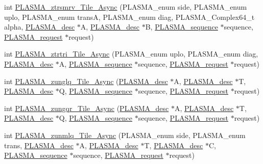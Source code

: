 \begin{DoxyCompactItemize}
\item 
int \hyperlink{group__PLASMA__Complex64__t__Tile__Async_ga0ed911d979585a7940b8436a4b90d494_ga0ed911d979585a7940b8436a4b90d494}{P\+L\+A\+S\+M\+A\+\_\+ztrsmrv\+\_\+\+Tile\+\_\+\+Async} (P\+L\+A\+S\+M\+A\+\_\+enum side, P\+L\+A\+S\+M\+A\+\_\+enum uplo, P\+L\+A\+S\+M\+A\+\_\+enum trans\+A, P\+L\+A\+S\+M\+A\+\_\+enum diag, P\+L\+A\+S\+M\+A\+\_\+\+Complex64\+\_\+t alpha, \hyperlink{structplasma__desc__t}{P\+L\+A\+S\+M\+A\+\_\+desc} $\ast$A, \hyperlink{structplasma__desc__t}{P\+L\+A\+S\+M\+A\+\_\+desc} $\ast$B, \hyperlink{structplasma__sequence__t}{P\+L\+A\+S\+M\+A\+\_\+sequence} $\ast$sequence, \hyperlink{structplasma__request__t}{P\+L\+A\+S\+M\+A\+\_\+request} $\ast$request)
\item 
int \hyperlink{group__PLASMA__Complex64__t__Tile__Async_gadfb88a401f30764bde58c38748e894bd_gadfb88a401f30764bde58c38748e894bd}{P\+L\+A\+S\+M\+A\+\_\+ztrtri\+\_\+\+Tile\+\_\+\+Async} (P\+L\+A\+S\+M\+A\+\_\+enum uplo, P\+L\+A\+S\+M\+A\+\_\+enum diag, \hyperlink{structplasma__desc__t}{P\+L\+A\+S\+M\+A\+\_\+desc} $\ast$A, \hyperlink{structplasma__sequence__t}{P\+L\+A\+S\+M\+A\+\_\+sequence} $\ast$sequence, \hyperlink{structplasma__request__t}{P\+L\+A\+S\+M\+A\+\_\+request} $\ast$request)
\item 
int \hyperlink{group__PLASMA__Complex64__t__Tile__Async_ga88e23a6307f8d2f1de2343b33954be5b_ga88e23a6307f8d2f1de2343b33954be5b}{P\+L\+A\+S\+M\+A\+\_\+zunglq\+\_\+\+Tile\+\_\+\+Async} (\hyperlink{structplasma__desc__t}{P\+L\+A\+S\+M\+A\+\_\+desc} $\ast$A, \hyperlink{structplasma__desc__t}{P\+L\+A\+S\+M\+A\+\_\+desc} $\ast$T, \hyperlink{structplasma__desc__t}{P\+L\+A\+S\+M\+A\+\_\+desc} $\ast$Q, \hyperlink{structplasma__sequence__t}{P\+L\+A\+S\+M\+A\+\_\+sequence} $\ast$sequence, \hyperlink{structplasma__request__t}{P\+L\+A\+S\+M\+A\+\_\+request} $\ast$request)
\item 
int \hyperlink{group__PLASMA__Complex64__t__Tile__Async_gafc2a8fdc018edb78cfa3fb1e671e16f4_gafc2a8fdc018edb78cfa3fb1e671e16f4}{P\+L\+A\+S\+M\+A\+\_\+zungqr\+\_\+\+Tile\+\_\+\+Async} (\hyperlink{structplasma__desc__t}{P\+L\+A\+S\+M\+A\+\_\+desc} $\ast$A, \hyperlink{structplasma__desc__t}{P\+L\+A\+S\+M\+A\+\_\+desc} $\ast$T, \hyperlink{structplasma__desc__t}{P\+L\+A\+S\+M\+A\+\_\+desc} $\ast$Q, \hyperlink{structplasma__sequence__t}{P\+L\+A\+S\+M\+A\+\_\+sequence} $\ast$sequence, \hyperlink{structplasma__request__t}{P\+L\+A\+S\+M\+A\+\_\+request} $\ast$request)
\item 
int \hyperlink{group__PLASMA__Complex64__t__Tile__Async_ga5a5533f0e5deb266bd38699d1361e25f_ga5a5533f0e5deb266bd38699d1361e25f}{P\+L\+A\+S\+M\+A\+\_\+zunmlq\+\_\+\+Tile\+\_\+\+Async} (P\+L\+A\+S\+M\+A\+\_\+enum side, P\+L\+A\+S\+M\+A\+\_\+enum trans, \hyperlink{structplasma__desc__t}{P\+L\+A\+S\+M\+A\+\_\+desc} $\ast$A, \hyperlink{structplasma__desc__t}{P\+L\+A\+S\+M\+A\+\_\+desc} $\ast$T, \hyperlink{structplasma__desc__t}{P\+L\+A\+S\+M\+A\+\_\+desc} $\ast$C, \hyperlink{structplasma__sequence__t}{P\+L\+A\+S\+M\+A\+\_\+sequence} $\ast$sequence, \hyperlink{structplasma__request__t}{P\+L\+A\+S\+M\+A\+\_\+request} $\ast$request)

\end{DoxyCompactItemize}
